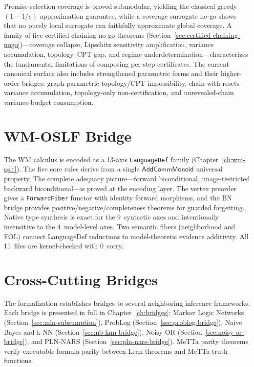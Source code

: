 \documentclass[11pt,openany]{report}
\begin{document}
Premise-selection coverage is proved submodular, yielding the classical
greedy $(1 - 1/e)$ approximation guarantee, while a coverage surrogate
no-go shows that no purely local surrogate can faithfully approximate
global coverage.  A family of five certified-chaining no-go theorems
(Section~\ref{sec:certified-chaining-nogo})---coverage collapse,
Lipschitz sensitivity amplification, variance accumulation,
topology--CPT gap, and regime underdetermination---characterizes the
fundamental limitations of composing per-step certificates.  The current
canonical surface also includes strengthened parametric forms and their
higher-order bridges: graph-parametric topology/CPT impossibility,
chain-with-resets variance accumulation, topology-only
non-certification, and unrevealed-chain variance-budget consumption.

\section{WM-OSLF Bridge}

The WM calculus is encoded as a 13-axis \texttt{LanguageDef} family
(Chapter~\ref{ch:wm-gslt}).  The five core rules derive from a single
$\mathsf{AddCommMonoid}$ universal property.  The complete adequacy
picture---forward biconditional, image-restricted backward
biconditional---is proved at the encoding layer.  The vertex preorder
gives a \texttt{ForwardFiber} functor with identity forward morphisms,
and the BN bridge provides positive/negative/completeness theorems for
guarded forgetting.  Native type synthesis is exact for the 9~syntactic
axes and intentionally insensitive to the 4~model-level axes.  Two
semantic fibers (neighborhood and FOL) connect LanguageDef reductions to
model-theoretic evidence additivity.  All 11~files are kernel-checked
with 0~sorry.

\section{Cross-Cutting Bridges}

The formalization establishes bridges to several neighboring
inference frameworks.  Each bridge is presented in full in
Chapter~\ref{ch:bridges}: Markov Logic Networks
(Section~\ref{sec:mln-subsumption}), ProbLog
(Section~\ref{sec:problog-bridge}), Naive Bayes and k-NN
(Section~\ref{sec:nb-knn-bridge}), Noisy-OR
(Section~\ref{sec:noisy-or-bridge}), and PLN-NARS
(Section~\ref{sec:pln-nars-bridge}).  MeTTa parity theorems verify
executable formula parity between Lean theorems and MeTTa truth
functions.
\end{document}
